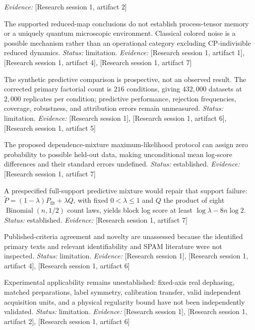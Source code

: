 \documentclass[11pt]{article}
\begin{document}
\begin{sloppypar}
\begin{description}
\textit{Evidence: }[Research session 1, artifact 2]
\item[C31] The supported reduced-map conclusions do not establish process-tensor memory or a uniquely quantum microscopic environment. Classical colored noise is a possible mechanism rather than an operational category excluding CP-indivisible reduced dynamics. \textit{Status: }limitation.
\textit{Evidence: }[Research session 1, artifact 1], [Research session 1, artifact 4], [Research session 1, artifact 7]
\item[C32] The synthetic predictive comparison is prospective, not an observed result. The corrected primary factorial count is $216$ conditions, giving $432{,}000$ datasets at $2{,}000$ replicates per condition; predictive performance, rejection frequencies, coverage, robustness, and attribution errors remain unmeasured. \textit{Status: }limitation.
\textit{Evidence: }[Research session 1], [Research session 1, artifact 6], [Research session 1, artifact 5]
\item[C33] The proposed dependence-mixture maximum-likelihood protocol can assign zero probability to possible held-out data, making unconditional mean log-score differences and their standard errors undefined. \textit{Status: }established.
\textit{Evidence: }[Research session 1, artifact 7]
\item[C34] A prespecified full-support predictive mixture would repair that support failure: $\widetilde P=(1-\lambda)P_{\mathrm{fit}}+\lambda Q$, with fixed $0<\lambda\leq1$ and $Q$ the product of eight $\operatorname{Binomial}(n,1/2)$ count laws, yields block log score at least $\log\lambda-8n\log2$. \textit{Status: }established.
\textit{Evidence: }[Research session 1, artifact 7]
\item[C35] Published-criteria agreement and novelty are unassessed because the identified primary texts and relevant identifiability and SPAM literature were not inspected. \textit{Status: }limitation.
\textit{Evidence: }[Research session 1], [Research session 1, artifact 4], [Research session 1, artifact 6]
\item[C36] Experimental applicability remains unestablished: fixed-axis real dephasing, matched preparations, label symmetry, calibration transfer, valid independent acquisition units, and a physical regularity bound have not been independently validated. \textit{Status: }limitation.
\textit{Evidence: }[Research session 1], [Research session 1, artifact 2], [Research session 1, artifact 6]
\end{description}
\end{sloppypar}
\end{document}
